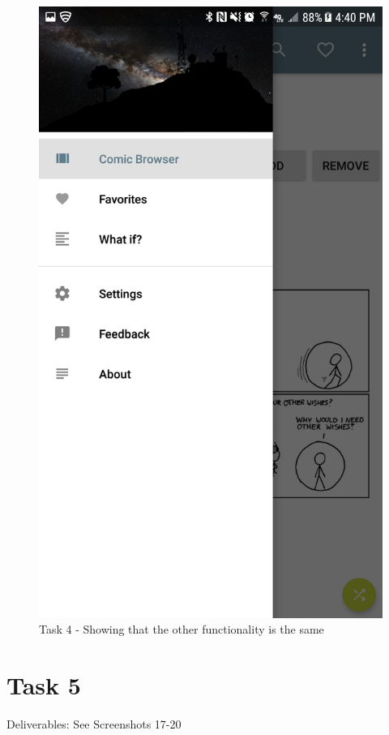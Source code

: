 \documentclass{article}
\makeatletter
\def\maxwidth#1{\ifdim\Gin@nat@width>#1 #1\else\Gin@nat@width\fi}
\makeatother
\begin{document}
	\begin{figure}[ht]
		\includegraphics[width=\maxwidth{3in}]{img/t4s4.png}
		\centering
		\caption{Task 4 - Showing that the other functionality is the same}
	\end{figure}

\clearpage
\section{Task 5}
Deliverables: See Screenshots 17-20
\end{document}
